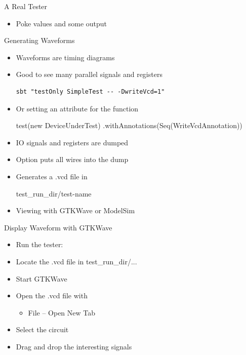 \begin{frame}[fragile]{A Real Tester}
\begin{itemize}
\item Poke values and  some output
\end{itemize}
\end{frame}



\begin{frame}[fragile]{Generating Waveforms}
\begin{itemize}
\item Waveforms are timing diagrams
\item Good to see many parallel signals and registers
\begin{verbatim}
sbt "testOnly SimpleTest -- -DwriteVcd=1"
\end{verbatim}
\item Or setting an attribute for the  function
\begin{chisel}
test(new DeviceUnderTest)
    .withAnnotations(Seq(WriteVcdAnnotation))
\end{chisel}
\item IO signals and registers are dumped
\item Option  puts all wires into the dump
\item Generates a .vcd file in
\begin{chisel}
    test_run_dir/test-name
\end{chisel}
\item Viewing with GTKWave or ModelSim
\end{itemize}
\end{frame}

\begin{frame}[fragile]{Display Waveform with GTKWave}
\begin{itemize}
\item Run the tester: 
\item Locate the .vcd file in test\_run\_dir/...
\item Start GTKWave
\item Open the .vcd file with
\begin{itemize}
\item File -- Open New Tab
\end{itemize}
\item Select the circuit
\item Drag and drop the interesting signals
\end{itemize}
\end{frame}


